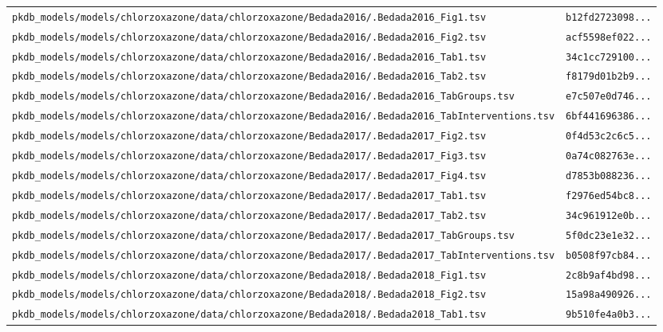 \documentclass{article}
\begin{document}
\begin{longtable}{ll}
\texttt{pkdb\_models/models/chlorzoxazone/data/chlorzoxazone/Bedada2016/.Bedada2016\_Fig1.tsv} & \texttt{b12fd2723098...} \\
\texttt{pkdb\_models/models/chlorzoxazone/data/chlorzoxazone/Bedada2016/.Bedada2016\_Fig2.tsv} & \texttt{acf5598ef022...} \\
\texttt{pkdb\_models/models/chlorzoxazone/data/chlorzoxazone/Bedada2016/.Bedada2016\_Tab1.tsv} & \texttt{34c1cc729100...} \\
\texttt{pkdb\_models/models/chlorzoxazone/data/chlorzoxazone/Bedada2016/.Bedada2016\_Tab2.tsv} & \texttt{f8179d01b2b9...} \\
\texttt{pkdb\_models/models/chlorzoxazone/data/chlorzoxazone/Bedada2016/.Bedada2016\_TabGroups.tsv} & \texttt{e7c507e0d746...} \\
\texttt{pkdb\_models/models/chlorzoxazone/data/chlorzoxazone/Bedada2016/.Bedada2016\_TabInterventions.tsv} & \texttt{6bf441696386...} \\
\texttt{pkdb\_models/models/chlorzoxazone/data/chlorzoxazone/Bedada2017/.Bedada2017\_Fig2.tsv} & \texttt{0f4d53c2c6c5...} \\
\texttt{pkdb\_models/models/chlorzoxazone/data/chlorzoxazone/Bedada2017/.Bedada2017\_Fig3.tsv} & \texttt{0a74c082763e...} \\
\texttt{pkdb\_models/models/chlorzoxazone/data/chlorzoxazone/Bedada2017/.Bedada2017\_Fig4.tsv} & \texttt{d7853b088236...} \\
\texttt{pkdb\_models/models/chlorzoxazone/data/chlorzoxazone/Bedada2017/.Bedada2017\_Tab1.tsv} & \texttt{f2976ed54bc8...} \\
\texttt{pkdb\_models/models/chlorzoxazone/data/chlorzoxazone/Bedada2017/.Bedada2017\_Tab2.tsv} & \texttt{34c961912e0b...} \\
\texttt{pkdb\_models/models/chlorzoxazone/data/chlorzoxazone/Bedada2017/.Bedada2017\_TabGroups.tsv} & \texttt{5f0dc23e1e32...} \\
\texttt{pkdb\_models/models/chlorzoxazone/data/chlorzoxazone/Bedada2017/.Bedada2017\_TabInterventions.tsv} & \texttt{b0508f97cb84...} \\
\texttt{pkdb\_models/models/chlorzoxazone/data/chlorzoxazone/Bedada2018/.Bedada2018\_Fig1.tsv} & \texttt{2c8b9af4bd98...} \\
\texttt{pkdb\_models/models/chlorzoxazone/data/chlorzoxazone/Bedada2018/.Bedada2018\_Fig2.tsv} & \texttt{15a98a490926...} \\
\texttt{pkdb\_models/models/chlorzoxazone/data/chlorzoxazone/Bedada2018/.Bedada2018\_Tab1.tsv} & \texttt{9b510fe4a0b3...} \\

\end{longtable}
\end{document}
